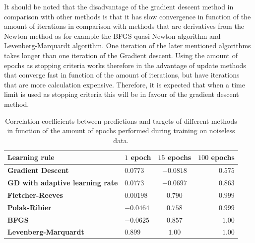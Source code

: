\documentclass[a4paper,10pt]{article}
\begin{document}
It should be noted that the disadvantage of the gradient descent method in comparison with other methods is that it has slow convergence in function of the amount of iterations in comparison with methods that are derivatives from the Newton method as for example the BFGS quasi Newton algorithm and Levenberg-Marquardt algorithm. One iteration of the later mentioned algorithms takes longer than one iteration of the Gradient descent. Using the amount of epochs as stopping criteria works therefore in the advantage of update methods that converge fast in function of the amount of iterations, but have iterations that are more calculation expensive. Therefore, it is expected that when a time limit is used as stopping criteria this will be in favour of the gradient descent method. \\

\begin{table}
	\centering
	\begin{tabular}{@{}l|lcr@{}} \toprule
		\textbf{Learning rule}    & $ 1 $ epoch & $ 15 $ epochs & $ 100 $ epochs \\\midrule
		\textbf{Gradient Descent}    & $ 0.0773 $  & $ -0.0818 $  & $ 0.575 $  \\
		\textbf{GD with adaptive learning rate} & $ 0.0773 $  & $ -0.0697 $  & $ 0.863 $  \\
		\textbf{Fletcher-Reeves} & $ 0.00198 $  & $ 0.790 $  & $ 0.999 $  \\
		\textbf{Polak-Ribier} & $ -0.0464 $  & $ 0.758 $  & $ 0.999 $  \\
		\textbf{BFGS} & $ -0.0625 $  & $ 0.857 $  & $ 1.00 $  \\
		\textbf{Levenberg-Marquardt} & $ 0.899 $  & $ 1.00 $  & $ 1.00 $  \\ \bottomrule
	\end{tabular}
	\caption{Correlation coefficients between predictions and targets of  different methods in function of the amount of epochs performed during training on noiseless data.}
	\label{tab:corr_no_noise}
\end{table}

\end{document}

